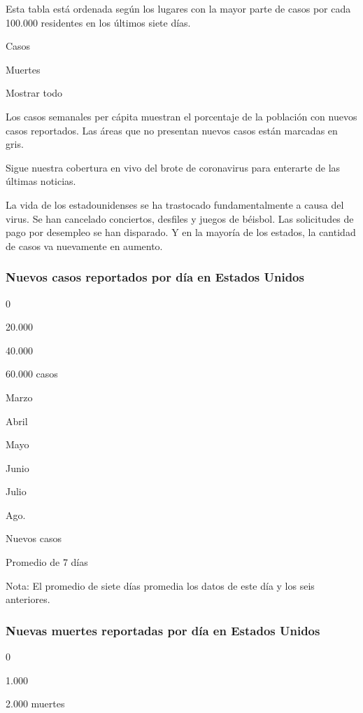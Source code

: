 Esta tabla está ordenada según los lugares con la mayor parte de casos
por cada 100.000 residentes en los últimos siete días.

Casos

Muertes

Mostrar todo

Los casos semanales per cápita muestran el porcentaje de la población
con nuevos casos reportados. Las áreas que no presentan nuevos casos
están marcadas en gris.

Sigue nuestra cobertura en vivo del brote de coronavirus para enterarte
de las últimas noticias.

La vida de los estadounidenses se ha trastocado fundamentalmente a causa
del virus. Se han cancelado conciertos, desfiles y juegos de béisbol.
Las solicitudes de pago por desempleo se han disparado. Y en la mayoría
de los estados, la cantidad de casos va nuevamente en aumento.

\hypertarget{nuevos-casos-reportados-por-duxeda-en-estados-unidos}{%
\subsubsection{Nuevos casos reportados por día en Estados
Unidos}\label{nuevos-casos-reportados-por-duxeda-en-estados-unidos}}

0

20.000

40.000

60.000 casos

Marzo

Abril

Mayo

Junio

Julio

Ago.

Nuevos casos

Promedio de 7 días

Nota: El promedio de siete días promedia los datos de este día y los
seis anteriores.

\hypertarget{nuevas-muertes-reportadas-por-duxeda-en-estados-unidos}{%
\subsubsection{Nuevas muertes reportadas por día en Estados
Unidos}\label{nuevas-muertes-reportadas-por-duxeda-en-estados-unidos}}

0

1.000

2.000 muertes

